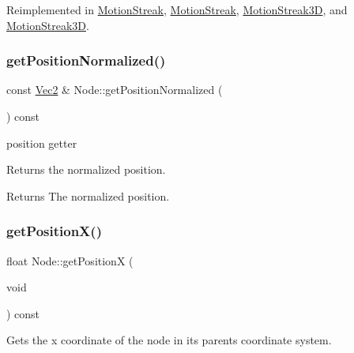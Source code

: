 Reimplemented in \hyperlink{classMotionStreak_ab07adb87a9770b5bbafa2fff999515f6}{Motion\+Streak}, \hyperlink{classMotionStreak_afa9dc064ec1140bf1e14e526221d5b72}{Motion\+Streak}, \hyperlink{classMotionStreak3D_ab2c89d13a16dc7ee2e8f2408a1f5afbb}{Motion\+Streak3D}, and \hyperlink{classMotionStreak3D_a60ec5113c30e2b81c15b43595a98ce63}{Motion\+Streak3D}.

\mbox{\label{classNode_ae9d2fb3ed00ccc33d22c1f903622950f}} 
\subsubsection{\texorpdfstring{get\+Position\+Normalized()}{getPositionNormalized()}}
{\footnotesize\ttfamily const \hyperlink{classVec2}{Vec2} \& Node\+::get\+Position\+Normalized (\begin{DoxyParamCaption}{ }\end{DoxyParamCaption}) const\hspace{0.3cm}{\ttfamily [virtual]}}



position getter 

Returns the normalized position.

\begin{DoxyReturn}{Returns}
The normalized position. 
\end{DoxyReturn}
\mbox{\label{classNode_ad4b27cd8bc98960789fbd2b574666a25}} 
\subsubsection{\texorpdfstring{get\+Position\+X()}{getPositionX()}\hspace{0.1cm}{\footnotesize\ttfamily [1/2]}}
{\footnotesize\ttfamily float Node\+::get\+PositionX (\begin{DoxyParamCaption}\item[{void}]{ }\end{DoxyParamCaption}) const\hspace{0.3cm}{\ttfamily [virtual]}}

Gets the x coordinate of the node in its parent\textquotesingle{}s coordinate system.

